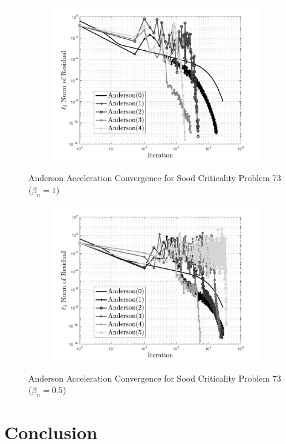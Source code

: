 \begin{figure}[!htbp]
\centering
\begin{subfigure}{\textwidth}
  \centering
  \includegraphics[width=.75\linewidth]{Figures/AndersonAcceleration/SoodProb73}
\end{subfigure}
\caption{Anderson Acceleration Convergence for Sood Criticality Problem 73 ($\beta_{n} = 1$)}
\label{fig:AASoodProb73}
\end{figure}

\begin{figure}[!htbp]
\centering
\begin{subfigure}{\textwidth}
  \centering
  \includegraphics[width=.75\linewidth]{Figures/AndersonAcceleration/SoodProb73_FPI1_HalfBeta}
\end{subfigure}
\caption{Anderson Acceleration Convergence for Sood Criticality Problem 73 ($\beta_{n} = 0.5$)}
\label{fig:AASoodProb73Half}
\end{figure}

\clearpage

\section{Conclusion}

